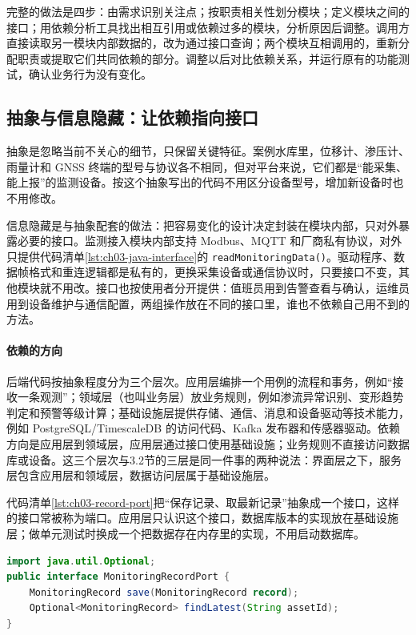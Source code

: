 完整的做法是四步：由需求识别关注点；按职责相关性划分模块；定义模块之间的接口；用依赖分析工具找出相互引用或依赖过多的模块，分析原因后调整。调用方直接读取另一模块内部数据的，改为通过接口查询；两个模块互相调用的，重新分配职责或提取它们共同依赖的部分。调整以后对比依赖关系，并运行原有的功能测试，确认业务行为没有变化。

\subsection{抽象与信息隐藏：让依赖指向接口}\label{sec:hierarchical-abstraction}

抽象是忽略当前不关心的细节，只保留关键特征。案例水库里，位移计、渗压计、雨量计和 GNSS 终端的型号与协议各不相同，但对平台来说，它们都是“能采集、能上报”的监测设备。按这个抽象写出的代码不用区分设备型号，增加新设备时也不用修改。

信息隐藏是与抽象配套的做法：把容易变化的设计决定封装在模块内部，只对外暴露必要的接口\cite{parnas1972}。监测接入模块内部支持 Modbus、MQTT 和厂商私有协议，对外只提供代码清单\ref{lst:ch03-java-interface}的 \texttt{readMonitoringData()}。驱动程序、数据帧格式和重连逻辑都是私有的，更换采集设备或通信协议时，只要接口不变，其他模块就不用改。接口也按使用者分开提供：值班员用到告警查看与确认，运维员用到设备维护与通信配置，两组操作放在不同的接口里，谁也不依赖自己用不到的方法。

\paragraph{依赖的方向}后端代码按抽象程度分为三个层次。应用层编排一个用例的流程和事务，例如“接收一条观测”；领域层（也叫业务层）放业务规则，例如渗流异常识别、变形趋势判定和预警等级计算；基础设施层提供存储、通信、消息和设备驱动等技术能力，例如 PostgreSQL/TimescaleDB 的访问代码、Kafka 发布器和传感器驱动。依赖方向是应用层到领域层，应用层通过接口使用基础设施；业务规则不直接访问数据库或设备。这三个层次与3.2节的三层是同一件事的两种说法：界面层之下，服务层包含应用层和领域层，数据访问层属于基础设施层。

代码清单\ref{lst:ch03-record-port}把“保存记录、取最新记录”抽象成一个接口，这样的接口常被称为端口。应用层只认识这个接口，数据库版本的实现放在基础设施层；做单元测试时换成一个把数据存在内存里的实现，不用启动数据库。

\begin{lstlisting}[label={lst:ch03-record-port},language=Java,caption={监测记录持久化端口}]
import java.util.Optional;
public interface MonitoringRecordPort {
    MonitoringRecord save(MonitoringRecord record);
    Optional<MonitoringRecord> findLatest(String assetId);
}
\end{lstlisting}

